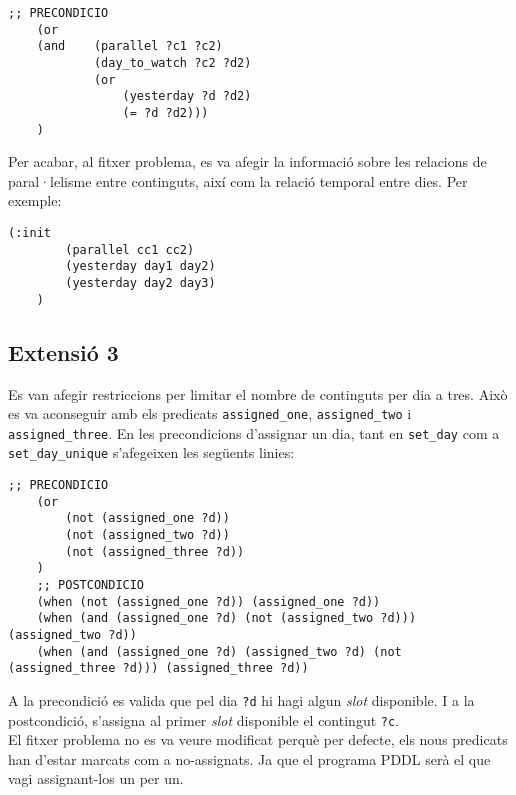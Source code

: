\documentclass[a4paper]{article}
\begin{document}
	\begin{lstlisting}[language=PDDL, caption={Restriccions per continguts paral·lels}, label={lst:extensio2}]
	;; PRECONDICIO
	(or
	(and 	(parallel ?c1 ?c2)
		 	(day_to_watch ?c2 ?d2)
		 	(or
				(yesterday ?d ?d2)
				(= ?d ?d2)))
	)
	\end{lstlisting}
	
	Per acabar, al fitxer problema, es va afegir la informació sobre les relacions de paral·lelisme entre continguts, així com la relació temporal entre dies. Per exemple:
	\begin{lstlisting}[language=PDDL, caption={Inicialització de paral·lels i dies consecutius}, label={lst:iniExtensio2}]
	(:init
		(parallel cc1 cc2)
		(yesterday day1 day2)
		(yesterday day2 day3)
	)
	\end{lstlisting}
	

	
	\subsection{Extensió 3}
	Es van afegir restriccions per limitar el nombre de continguts per dia a tres. Això es va aconseguir amb els predicats \texttt{assigned\_one}, \texttt{assigned\_two} i \texttt{assigned\_three}. En les precondicions d'assignar un dia, tant en \texttt{set\_day} com a \texttt{set\_day\_unique} s'afegeixen les següents linies: \\
	
	\begin{lstlisting}[language=PDDL, caption={Fragment per limitar a 3 els continguts per dia}, label={lst:extensio3}]
	;; PRECONDICIO	
	(or 
		(not (assigned_one ?d))
		(not (assigned_two ?d))
		(not (assigned_three ?d))
	)
	;; POSTCONDICIO
	(when (not (assigned_one ?d)) (assigned_one ?d))
	(when (and (assigned_one ?d) (not (assigned_two ?d))) (assigned_two ?d))
	(when (and (assigned_one ?d) (assigned_two ?d) (not (assigned_three ?d))) (assigned_three ?d))
	\end{lstlisting}
	
	A la precondició es valida que pel dia \texttt{?d} hi hagi algun \textit{slot} disponible. I a la postcondició, s'assigna al primer \textit{slot} disponible el contingut \texttt{?c}. \\
	
	El fitxer problema no es va veure modificat perquè per defecte, els nous predicats han d'estar marcats com a no-assignats. Ja que el programa PDDL serà el que vagi assignant-los un per un.
\end{document}
